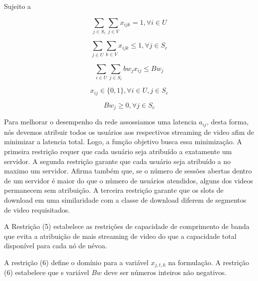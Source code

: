 Sujeito a

\begin{equation}\label{bound_1}
\sum_{ j \in S_{c} }
\sum_{ j \in V}
x_{ijk} = 1,  \forall i \in U
\end{equation}

\begin{equation}\label{bound_1}
\sum_{ j \in U}
\sum_{ k \in V }
x_{ijk} \leq 1,  \forall j \in S_{c}
\end{equation}

\begin{equation}\label{minimize}
\sum_{i \in U}
\sum_{j \in S_{c}}
bw_{j} x_{ij}
\leq Bw_{j}
\end{equation}

\begin{equation}\label{minimize}
x_{ij}  \in  \{0, 1\}, \forall i \in U,j \in S_{c}
\end{equation}

\begin{equation}\label{minimize}
Bw_{j} \geq  0, \forall j \in S_{c}
\end{equation}
\vspace{1.2cm}

Para melhorar o desempenho da rede assossiamos uma latencia $a_{ij}$, desta forma, nós devemos atribuir todos os usuários aos respectivos streaming de video afim de minimizar a latencia total.
Logo, a função objetivo busca essa minimização. A primeira restrição requer que cada usuário seja atribuído a exatamente um servidor. A segunda restrição garante que cada usuário seja atribuído a no maximo um servidor. Afirma também que, se o número de sessões abertas dentro de um servidor é maior do que o número de usuários atendidos, alguns dos videos permanecem sem atribuição. A terceira restrição garante que os slots de download em uma similaridade com a classe de download diferem de segmentos de video requisitados.

A Restrição (5) estabelece as restrições de capacidade de comprimento de banda que evita a atribuição de mais streaming de video do que a capacidade total disponível para cada nó de névoa.

A restrição (6) define o domínio para a variável $x_{j, t, k}$ na formulação. A restrição (6) estabelece que s variável $Bw$ deve ser números inteiros não negativos.

